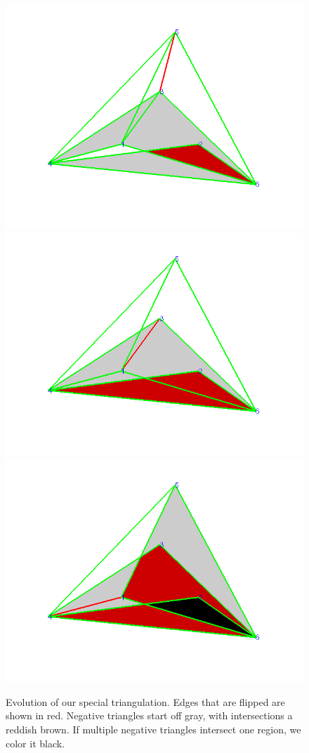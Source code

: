 \documentclass[12pt]{article}
\begin{document}
\begin{figure}
\includegraphics[scale = .45]{Pictures3/triExD3.png}
\includegraphics[scale = .45]{Pictures3/triExD4.png}
\includegraphics[scale = .45]{Pictures3/triExD5.png}
\caption{Evolution of our special triangulation. Edges that are flipped are shown in red. Negative triangles start off gray, with intersections a reddish brown. If multiple negative triangles intersect one region, we color it black.}
\label{specialCase}
\end{figure}
\end{document}
